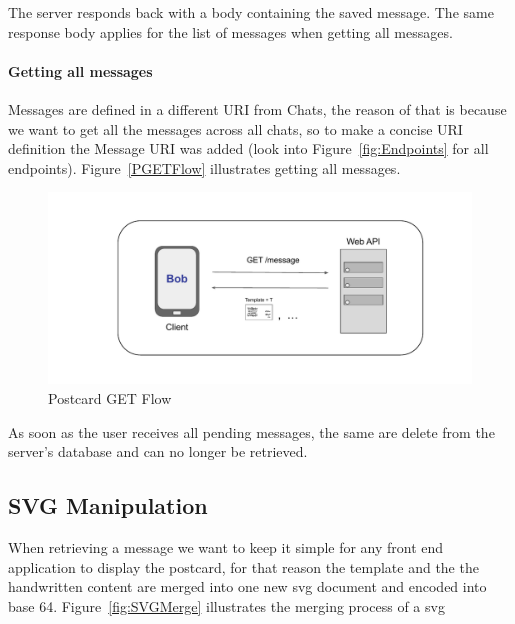 \bigskip
\bigskip
\bigskip

The server responds back with a body containing the saved message.  The same response body applies for the list of messages when getting all messages.  


\paragraph{Getting all messages} Messages are defined in a different URI from Chats, the reason of that is because we want to get all the messages across all chats, so to make a concise URI definition the Message URI was added (look into Figure~\ref{fig:Endpoints} for all endpoints).
Figure~\ref{PGETFlow} illustrates getting all messages.

\begin{figure}[!ht]
	\centering
	\includegraphics[width=1\textwidth]{./Chapter4/Figures/Postcard GET Flow}
	\caption{Postcard GET Flow}
	\label{fig:PGETFlow}
\end{figure}

As soon as the user receives all pending messages, the same are delete from the server's database and can no longer be retrieved. 

\bigskip
\bigskip
\bigskip


\subsection{SVG Manipulation}
\label{subsec:SVGManipulation}
When retrieving a message we want to keep it simple for any front end application to display the postcard, for that reason the template and the the handwritten content are merged into one new \gls{svg} document and encoded into base 64. Figure~\ref{fig:SVGMerge} illustrates the merging process of a \gls{svg}

